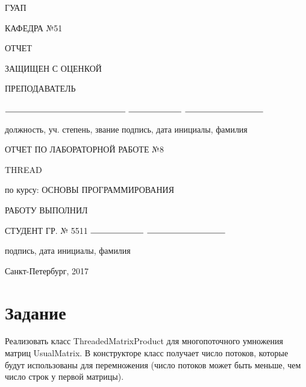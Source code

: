 \documentclass{article}
\begin{document}
\begin{titlepage}
	\begin{center}
    	ГУАП
    	\vspace{0.25cm}

    	КАФЕДРА №51
	\end{center}

    \begin{flushleft}

    	ОТЧЕТ

    	ЗАЩИЩЕН С ОЦЕНКОЙ

		ПРЕПОДАВАТЕЛЬ


    	\vspace{0.5cm}

		$\rule{5cm}{0.15mm}$ \hfill $\rule{2.2cm}{0.15mm}$  \hfill $\rule{3.25cm}{0.15mm}$

		должность, уч. степень, звание \hfill подпись, дата \hfill инициалы, фамилия
    \end{flushleft}

 	
    \hspace{2cm}

	\begin{center}
    	ОТЧЕТ ПО ЛАБОРАТОРНОЙ РАБОТЕ №8


    	\vspace{1cm}

    	THREAD


    	\vspace{1cm}

    	по курсу: ОСНОВЫ ПРОГРАММИРОВАНИЯ {\MakeUppercase{}}
    \end{center}

    \vspace{3cm}

    \begin{flushleft}
    	РАБОТУ ВЫПОЛНИЛ

    	СТУДЕНТ ГР. № 5511 \hfill $\rule{2.2cm}{0.15mm}$  \hfill $\rule{3.25cm}{0.15mm}$

    	\hspace{7.8cm} подпись, дата \hfill инициалы, фамилия
    \end{flushleft}

	\vspace{5cm}
	\begin{center}
 		Санкт-Петербург, 2017
	\end{center}
\end{titlepage}

\section{Задание}
Реализовать класс ThreadedMatrixProduct для многопоточного умножения матриц UsualMatrix. В конструкторе класс получает число потоков, которые будут использованы для перемножения (число потоков может быть меньше, чем число строк у первой матрицы).
\end{document}

